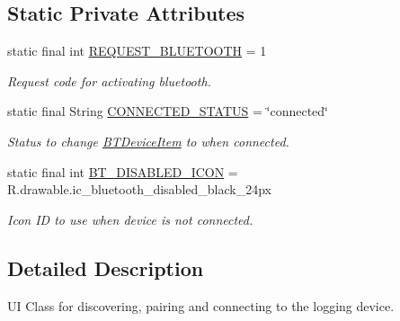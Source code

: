 \subsection*{Static Private Attributes}
\begin{DoxyCompactItemize}
\item 
\mbox{\label{class_android_app_1_1_pair_device_fragment_a6d3f89529498ff90429ca5c74de2b177}} 
static final int \hyperlink{class_android_app_1_1_pair_device_fragment_a6d3f89529498ff90429ca5c74de2b177}{R\+E\+Q\+U\+E\+S\+T\+\_\+\+B\+L\+U\+E\+T\+O\+O\+TH} = 1
\begin{DoxyCompactList}\small\item\em Request code for activating bluetooth. \end{DoxyCompactList}\item 
\mbox{\label{class_android_app_1_1_pair_device_fragment_a199a2a30c45008ec5a7360d11854f02f}} 
static final String \hyperlink{class_android_app_1_1_pair_device_fragment_a199a2a30c45008ec5a7360d11854f02f}{C\+O\+N\+N\+E\+C\+T\+E\+D\+\_\+\+S\+T\+A\+T\+US} = \char`\"{}connected\char`\"{}
\begin{DoxyCompactList}\small\item\em Status to change \hyperlink{class_android_app_1_1_b_t_device_item}{B\+T\+Device\+Item} to when connected. \end{DoxyCompactList}\item 
\mbox{\label{class_android_app_1_1_pair_device_fragment_a68e4843e20a0d81574ba3d9e78a67be5}} 
static final int \hyperlink{class_android_app_1_1_pair_device_fragment_a68e4843e20a0d81574ba3d9e78a67be5}{B\+T\+\_\+\+D\+I\+S\+A\+B\+L\+E\+D\+\_\+\+I\+C\+ON} = R.\+drawable.\+ic\+\_\+bluetooth\+\_\+disabled\+\_\+black\+\_\+24px
\begin{DoxyCompactList}\small\item\em Icon ID to use when device is not connected. \end{DoxyCompactList}\end{DoxyCompactItemize}


\subsection{Detailed Description}
UI Class for discovering, pairing and connecting to the logging device. 

